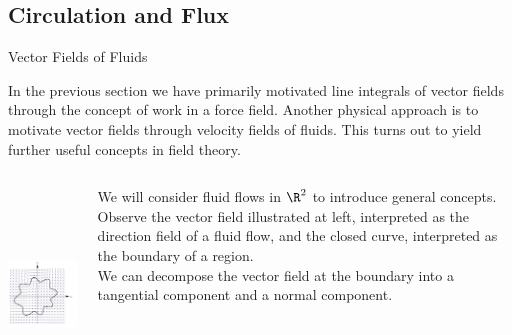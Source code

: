 \documentclass[smaller,hyperref={CJKbookmarks=true}]{beamer}
\begin{document}
\subsection{Circulation and Flux}
\begin{frame}[c]
\begin{spacing}{2.5}
\tableofcontents[sectionstyle=hide,subsectionstyle=show/shaded/hide]
\end{spacing}
\end{frame}
\begin{frame}[t]{Vector Fields of Fluids}
\begin{spacing}{1.1}
In the previous section we have primarily motivated line integrals of vector
fields through the concept of work in a force field. Another physical
approach is to motivate vector fields through velocity fields of fluids. This
turns out to yield further useful concepts in field theory.\\
\begin{columns}[onlytextwidth]
\begin{column}{0.5\textwidth}
\includegraphics[width=\columnwidth,height=160pt]{88.jpg}
\end{column}
\begin{column}{0.5\textwidth}
We will consider fluid flows in $\R^2$ to
introduce general concepts. Observe
the vector field illustrated at left, interpreted
as the direction field of a
fluid flow, and the closed curve, interpreted as the boundary of a region.\\[5pt]
We can decompose the vector field at
the boundary into a tangential component and a normal component.
\end{column}
\end{columns}
\end{spacing}
\end{frame}
\end{document}
